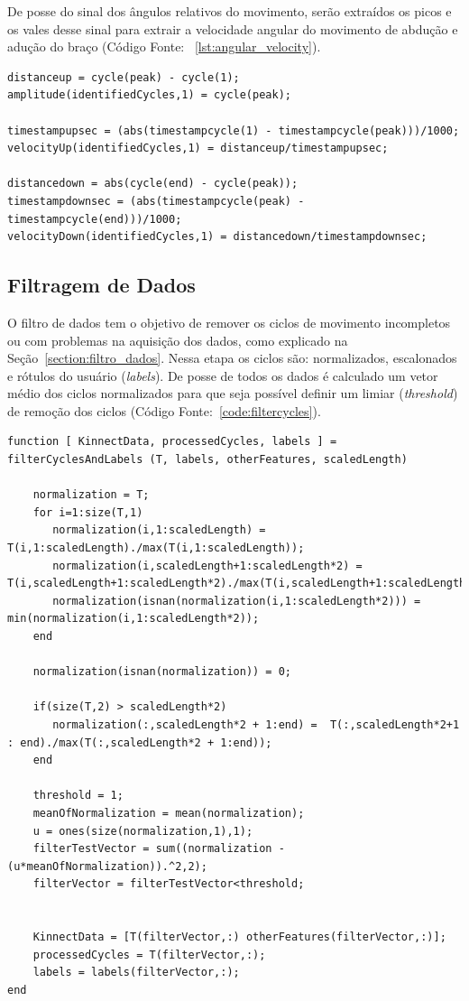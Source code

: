De posse do sinal dos ângulos relativos do movimento, serão extraídos os picos e os vales desse sinal para  extrair a velocidade angular do movimento de abdução e adução do braço (Código Fonte: ~\ref{lst:angular_velocity}).
    
\begin{lstlisting}[frame=single, caption=Calcular Velociodade Angular Adução e Abdução, label=lst:angular_velocity]	
distanceup = cycle(peak) - cycle(1);
amplitude(identifiedCycles,1) = cycle(peak);
    
timestampupsec = (abs(timestampcycle(1) - timestampcycle(peak)))/1000;
velocityUp(identifiedCycles,1) = distanceup/timestampupsec;

distancedown = abs(cycle(end) - cycle(peak));
timestampdownsec = (abs(timestampcycle(peak) - timestampcycle(end)))/1000;
velocityDown(identifiedCycles,1) = distancedown/timestampdownsec;
\end{lstlisting}	
		
\subsection{Filtragem de Dados}
O filtro de dados tem o objetivo de remover os ciclos de movimento incompletos ou com problemas na aquisição dos dados, como explicado na Seção~\ref{section:filtro_dados}. Nessa etapa os ciclos são: normalizados, escalonados e rótulos do usuário (\textit{labels}). 
De posse de todos os dados é calculado um vetor médio dos ciclos normalizados para que seja possível definir um limiar (\textit{threshold}) de remoção dos ciclos (Código Fonte:~\ref{code:filtercycles}).

	\begin{lstlisting}[frame=single, caption=Calcular Velociodade Angular Adução e Abdução, label=code:filtercycles]
function [ KinnectData, processedCycles, labels ] = filterCyclesAndLabels (T, labels, otherFeatures, scaledLength)

    normalization = T;
    for i=1:size(T,1)
       normalization(i,1:scaledLength) = T(i,1:scaledLength)./max(T(i,1:scaledLength));
       normalization(i,scaledLength+1:scaledLength*2) = T(i,scaledLength+1:scaledLength*2)./max(T(i,scaledLength+1:scaledLength*2));
       normalization(isnan(normalization(i,1:scaledLength*2))) = min(normalization(i,1:scaledLength*2));
    end
    
    normalization(isnan(normalization)) = 0;
    
    if(size(T,2) > scaledLength*2) 
       normalization(:,scaledLength*2 + 1:end) =  T(:,scaledLength*2+1 : end)./max(T(:,scaledLength*2 + 1:end));
    end
    
    threshold = 1;
    meanOfNormalization = mean(normalization);
    u = ones(size(normalization,1),1);
    filterTestVector = sum((normalization - (u*meanOfNormalization)).^2,2);
    filterVector = filterTestVector<threshold;
    
       
    KinnectData = [T(filterVector,:) otherFeatures(filterVector,:)];
    processedCycles = T(filterVector,:);
    labels = labels(filterVector,:);    
end
\end{lstlisting}	


